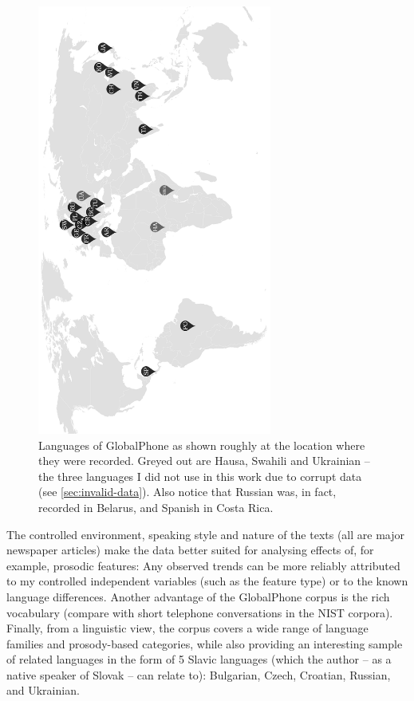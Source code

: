 \documentclass[bsc,frontabs,twoside,singlespacing,parskip,deptreport]{infthesis}
\begin{document}
{{    \begin{figure}[h!]
      \centering
      \includegraphics[width=7.7cm, angle=270]{graphics/GlobalPhone-map.pdf}
      \vspace*{-1em}
      \caption{Languages of GlobalPhone as shown roughly at the location where they were recorded. Greyed out are Hausa, Swahili and Ukrainian -- the three languages I did not use in this work due to corrupt data (see \autoref{sec:invalid-data}). Also notice that Russian was, in fact, recorded in Belarus, and Spanish in Costa Rica.}
      \label{fig:GlobalPhone-map}
    \end{figure}
    
    The controlled environment, speaking style and nature of the texts (all are major newspaper articles) make the data better suited for analysing effects of, for example, prosodic features: Any observed trends can be more reliably attributed to my controlled independent variables (such as the feature type) or to the known language differences.
    Another advantage of the GlobalPhone corpus is the rich vocabulary (compare with short telephone conversations in the NIST corpora).
    Finally, from a linguistic view, the corpus covers a wide range of language families and prosody-based categories, while also providing an interesting sample of related languages in the form of 5 Slavic languages (which the author -- as a native speaker of Slovak -- can relate to): Bulgarian, Czech, Croatian, Russian, and Ukrainian.

}}
\end{document}
